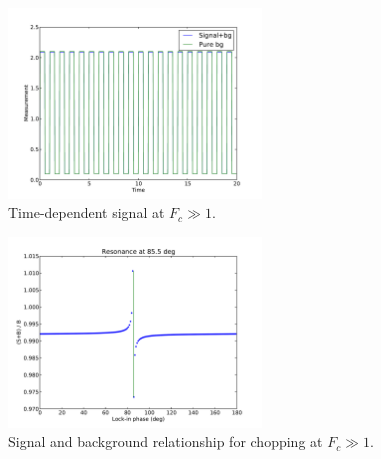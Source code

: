 \documentclass[10pt,a4paper]{article}
\begin{document}
\begin{figure}[h]
\centering
\includegraphics[width=0.6\textwidth]{figures/cpt02_0.pdf}
\caption{Time-dependent signal at $F_c \gg 1$.}
\label{fig:choptime2}
\end{figure}
\begin{figure}[h]
\centering
\includegraphics[width=0.6\textwidth]{figures/cpt02_3.pdf}
\caption{Signal and background relationship for chopping at $F_c \gg 1$.}
\label{fig:chopphase2}
\end{figure}



\end{document}
